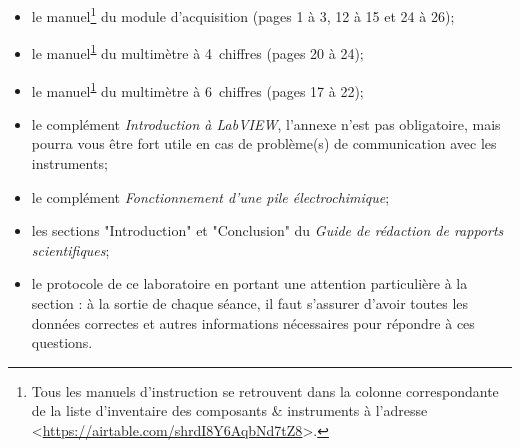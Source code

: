 \documentclass[canadien,12pt,oneside,letterpaper]{article}
\renewcommand\footnotemark{}
\begin{document}
\begin{itemize} \itemsep3pt
\item le manuel\footnote{\label{airtable}Tous les manuels d'instruction se retrouvent dans la colonne correspondante de la liste d'inventaire des composants \& instruments à l'adresse <\url{https://airtable.com/shrdI8Y6AqbNd7tZ8}>.} du module d'acquisition (pages 1 à 3, 12 à 15 et 24 à 26);
\item le manuel\textsuperscript{\footnotemark\ref{airtable}} du multimètre à 4\textonehalf~chiffres (pages 20 à 24); 
\item le manuel\textsuperscript{\footnotemark\ref{airtable}} du multimètre à 6\textonehalf~chiffres (pages 17 à 22);
\item le complément \textit{Introduction à LabVIEW}, l'annexe n'est pas obligatoire, mais pourra vous être fort utile en cas de problème(s) de communication avec les instruments;
\item le complément \textit{Fonctionnement d'une pile électrochimique};
\item les sections "Introduction" et "Conclusion" du \textit{Guide de rédaction de rapports scientifiques};
\item le protocole de ce laboratoire en portant une attention particulière à la section : à la sortie de chaque séance, il faut s'assurer d'avoir toutes les données correctes et autres informations nécessaires pour répondre à ces questions.
\end{itemize}
\vspace{1ex}
\noindent{}


\end{document}
